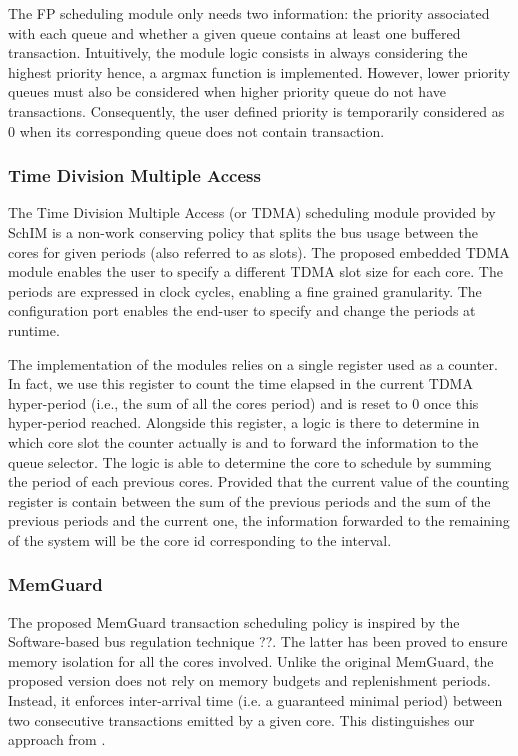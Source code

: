            The FP scheduling module only needs two information: the priority associated with each queue and whether a given queue contains at least one buffered transaction. Intuitively, the module logic consists in always considering the highest priority hence, a argmax function is implemented. However, lower priority queues must also be considered when higher priority queue do not have transactions. Consequently, the user defined priority is temporarily considered as 0 when its corresponding queue does not contain transaction.
        
        \subsubsection{Time Division Multiple Access}
            The Time Division Multiple Access (or TDMA) scheduling module provided by SchIM is a non-work conserving policy that splits the bus usage between the cores for given periods (also referred to as slots). The proposed embedded TDMA module enables the user to specify a different TDMA slot size for each core. The periods are expressed in clock cycles, enabling a fine grained granularity. The configuration port enables the end-user to specify and change the periods at runtime.
            
            The implementation of the modules relies on a single register used as a counter. In fact, we use this register to count the time elapsed in the current TDMA hyper-period (i.e., the sum of all the cores period) and is reset to 0 once this hyper-period reached. Alongside this register, a logic is there to determine in which core slot the counter actually is and to forward the information to the queue selector. The logic is able to determine the core to schedule by summing the period of each previous cores. Provided that the current value of the counting register is contain between the sum of the previous periods and the sum of the previous periods and the current one, the information forwarded to the remaining of the system will be the core id corresponding to the interval.
        
        \subsubsection{MemGuard}
            The proposed MemGuard transaction scheduling policy is inspired by the Software-based bus regulation technique ??. The latter has been proved to ensure memory isolation for all the cores involved. Unlike the original MemGuard, the proposed version does not rely on memory budgets and replenishment periods. Instead, it enforces inter-arrival time (i.e. a guaranteed minimal period) between two consecutive transactions emitted by a given core. This distinguishes our approach from \cite{Farshchi2020BRUBR}.
                    
